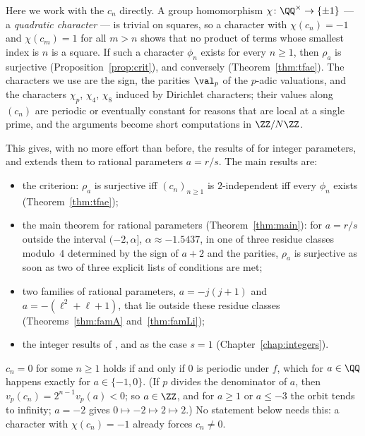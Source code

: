 Here we work with the $c_n$ directly. A group homomorphism $\chi \colon \QQ^\times \to \{\pm 1\}$
--- a \emph{quadratic character} --- is trivial on squares, so a character with
$\chi(c_n) = -1$ and $\chi(c_m) = 1$ for all $m > n$ shows that no product of terms whose
smallest index is $n$ is a square. If such a character $\phi_n$ exists for every $n \ge 1$,
then $\rho_a$ is surjective (Proposition~\ref{prop:crit}), and conversely
(Theorem~\ref{thm:tfae}). The characters we use are the sign, the parities $\val_p$ of the
$p$-adic valuations, and the characters $\chi_p$, $\chi_4$, $\chi_8$ induced by Dirichlet
characters; their values along $(c_n)$ are periodic or eventually constant for reasons that are
local at a single prime, and the arguments become short computations in $\ZZ/N\ZZ$.

This gives, with no more effort than before, the results of \cite{paper, li2020, li2021} for
integer parameters, and extends them to rational parameters $a = r/s$. The main results are:
\begin{itemize}
  \item the criterion: $\rho_a$ is surjective iff $(c_n)_{n \ge 1}$ is $2$-independent iff every
        $\phi_n$ exists (Theorem~\ref{thm:tfae});
  \item the main theorem for rational parameters (Theorem~\ref{thm:main}): for $a = r/s$ outside
        the interval $(-2, \alpha]$, $\alpha \approx -1.5437$, in one of three residue classes
        modulo~$4$ determined by the sign of $a + 2$ and the parities, $\rho_a$ is surjective
        as soon as two of three explicit lists of conditions are met;
  \item two families of rational parameters, $a = -j(j+1)$ and $a = -(\ell^2 + \ell + 1)$, that
        lie outside these residue classes (Theorems~\ref{thm:famA} and~\ref{thm:famLi});
  \item the integer results of \cite{paper}, \cite{li2020} and \cite{li2021} as the case $s = 1$
        (Chapter~\ref{chap:integers}).
\end{itemize}

\begin{remark}
  \label{rem:nonzero}
  $c_n = 0$ for some $n \ge 1$ holds if and only if $0$ is periodic under $f$, which for
  $a \in \QQ$ happens exactly for $a \in \{-1, 0\}$. (If $p$ divides the denominator of $a$, then
  $v_p(c_n) = 2^{n-1} v_p(a) < 0$; so $a \in \ZZ$, and for $a \ge 1$ or $a \le -3$ the orbit
  tends to infinity; $a = -2$ gives $0 \mapsto -2 \mapsto 2 \mapsto 2$.) No statement below needs
  this: a character with $\chi(c_n) = -1$ already forces $c_n \ne 0$.
\end{remark}

